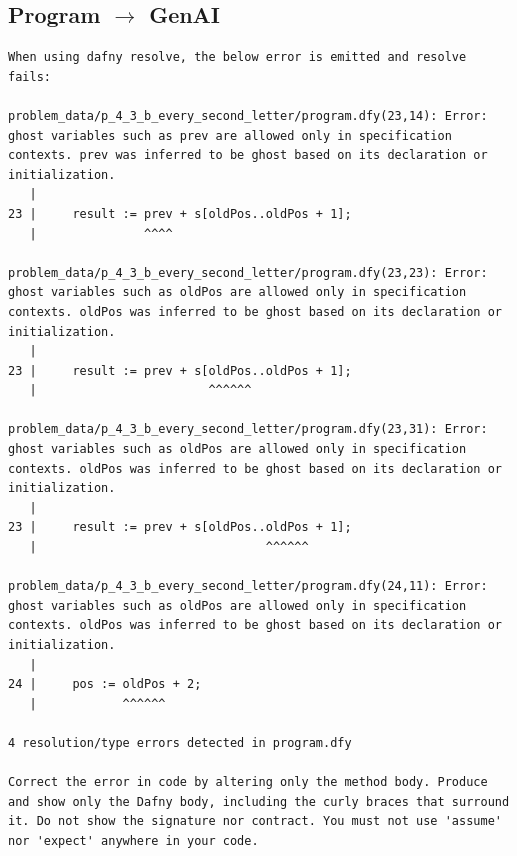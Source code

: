 \documentclass{article}
\begin{document}
\subsection*{Program $\rightarrow$ GenAI}
\begin{lstlisting}
When using dafny resolve, the below error is emitted and resolve fails:

problem_data/p_4_3_b_every_second_letter/program.dfy(23,14): Error: ghost variables such as prev are allowed only in specification contexts. prev was inferred to be ghost based on its declaration or initialization.
   |
23 |     result := prev + s[oldPos..oldPos + 1];
   |               ^^^^

problem_data/p_4_3_b_every_second_letter/program.dfy(23,23): Error: ghost variables such as oldPos are allowed only in specification contexts. oldPos was inferred to be ghost based on its declaration or initialization.
   |
23 |     result := prev + s[oldPos..oldPos + 1];
   |                        ^^^^^^

problem_data/p_4_3_b_every_second_letter/program.dfy(23,31): Error: ghost variables such as oldPos are allowed only in specification contexts. oldPos was inferred to be ghost based on its declaration or initialization.
   |
23 |     result := prev + s[oldPos..oldPos + 1];
   |                                ^^^^^^

problem_data/p_4_3_b_every_second_letter/program.dfy(24,11): Error: ghost variables such as oldPos are allowed only in specification contexts. oldPos was inferred to be ghost based on its declaration or initialization.
   |
24 |     pos := oldPos + 2;
   |            ^^^^^^

4 resolution/type errors detected in program.dfy

Correct the error in code by altering only the method body. Produce and show only the Dafny body, including the curly braces that surround it. Do not show the signature nor contract. You must not use 'assume' nor 'expect' anywhere in your code.
\end{lstlisting}
\end{document}

